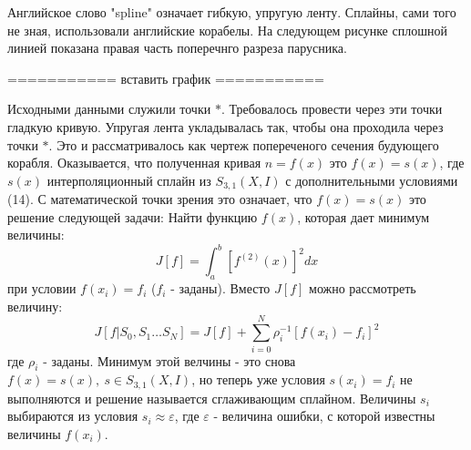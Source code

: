 Английское слово "spline" означает гибкую, упругую ленту. Сплайны, сами того не зная, использовали английские корабелы. На следующем рисунке сплошной линией показана правая часть поперечнго разреза парусника. 

===========
вставить график
===========

Исходными данными служили точки $\ast$. Требовалось провести через эти точки гладкую кривую. Упругая лента укладывалась так, чтобы она проходила через точки $\ast$. Это и рассматривалось как чертеж попереченого сечения будующего корабля. Оказывается, что полученная кривая $n=f(x)$ это $f(x)=s(x)$, где $s(x)$ интерполяционный сплайн из $S_{3,1}(X,I)$ с дополнительными условиями (14).
С математической точки зрения это означает, что $f(x)=s(x)$ это решение следующей задачи: Найти функцию $f(x)$, которая дает минимум величины:
\begin{equation}
J[f]=\int_a^b[f^{(2)}(x)]^2dx
\end{equation}
при условии $f(x_i)=f_i$ ($f_i$ - заданы).
Вместо $J[f]$ можно рассмотреть величину:
\begin{equation}
J[ f| S_{0},S_1\ldots S_{N}] = J \left[ f\right] + \sum ^{N}_{i=0}\rho^{-1}_{i}\left[ f\left( x_{i}\right) -f_{i}\right] ^{2}
\end{equation}
где $\rho_i$ - заданы. Минимум этой велчины - это снова $f(x)=s(x), \ s\in S_{3,1}(X,I)$, 
но теперь уже условия $s(x_i)=f_i$ не выполняются и решение называется сглаживающим сплайном. Величины $s_i$ выбираются из условия $s_i\approx \varepsilon$, где $\varepsilon$ - величина ошибки, с которой известны величины $f(x_i)$.